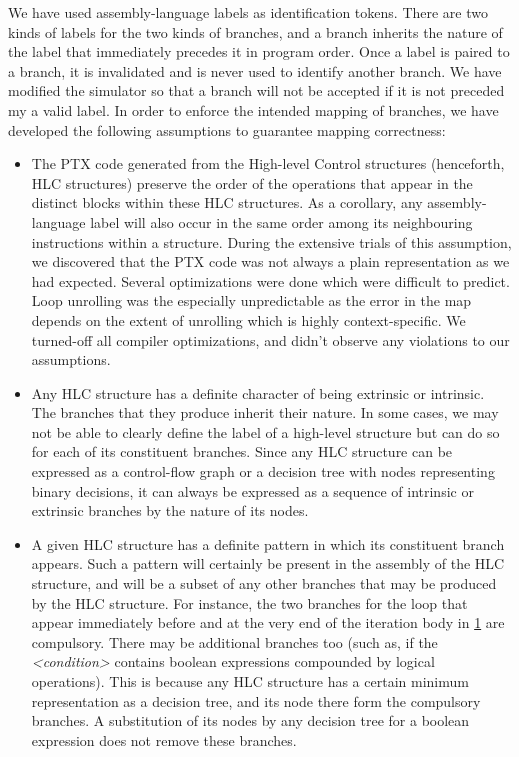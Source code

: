 	We have used assembly-language labels as identification tokens. There are two kinds of labels for the two kinds of branches, and a branch inherits the nature of the label that immediately precedes it in program order. Once a label is paired to a branch, it is invalidated and is never used to identify another branch. We have modified the simulator so that a branch will not be accepted if it is not preceded my a valid label. In order to enforce the intended mapping of branches, we have developed the following assumptions to guarantee mapping correctness:
		
	\begin{itemize}
	\begin{figure}
		
		\caption{The template for a For-loop in C, a widely used HLC structure
			\label{fig:for_template}}
	\end{figure}
	\item The PTX code generated from the High-level Control structures (henceforth, HLC structures) preserve the order of the operations that appear in the distinct blocks within these HLC structures. As a corollary, any assembly-language label will also occur in the same order among its neighbouring instructions within a structure. During the extensive trials of this assumption, we discovered that the PTX code was not always a plain representation as we had expected. Several optimizations were done which were difficult to predict. Loop unrolling was the especially unpredictable as the error in the map depends on the extent of unrolling which is highly context-specific. We turned-off all compiler optimizations, and didn't observe any violations to our assumptions.

	\item Any HLC structure has a definite character of being extrinsic or intrinsic. The branches that they produce inherit their nature. In some cases, we may not be able to clearly define the label of a high-level structure but can do so for each of its constituent branches. Since any HLC structure can be expressed as a control-flow graph or a decision tree with nodes representing binary decisions, it can always be expressed as a sequence of intrinsic or extrinsic branches by the nature of its nodes.

	\item A given HLC structure has a definite pattern in which its constituent branch appears. Such a pattern will certainly be present in the assembly of the HLC structure, and will be a subset of any other branches that may be produced by the HLC structure. For instance, the two branches for the loop that appear immediately before and at the very end of the iteration body in \ref{fig:for_template} are compulsory. There may be additional branches too (such as, if the \textsl{<condition>} contains boolean expressions compounded by logical operations). This is because any HLC structure has a certain minimum representation as a decision tree, and its node there form the compulsory branches. A substitution of its nodes by any decision tree for a boolean expression does not remove these branches.


\end{itemize}
